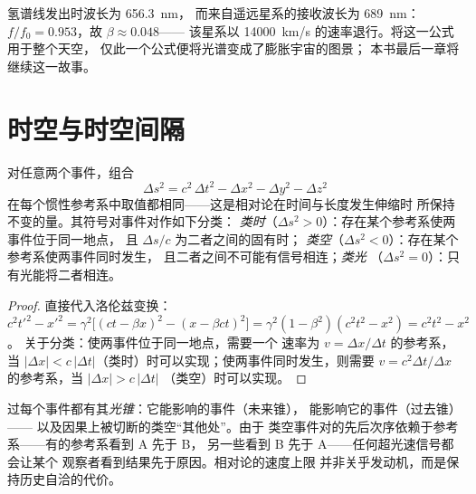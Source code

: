 \begin{example}[星系的退行]\label{ex:b3:relativistic-kinematics:redshift}
氢谱线发出时波长为 \qty{656.3}{nm}，
而来自遥远星系的接收波长为 \qty{689}{nm}：$f/f_0 = 0.953$，故 $\beta \approx 0.048$——
该星系以 \qty{14000}{km/s} 的速率退行。将这一公式用于整个天空，
仅此一个公式便将光谱变成了膨胀宇宙的图景；
本书最后一章将继续这一故事。
\end{example}

\section{时空与时空间隔}

\begin{theorem}[不变时空间隔]\label{thm:b3:relativistic-kinematics:interval}
对任意两个事件，组合
\[
\Delta s^2 = c^2\,\Delta t^2 - \Delta x^2 - \Delta y^2 - \Delta z^2
\]
在每个惯性参考系中取值都相同——这是相对论在时间与长度发生伸缩时
所保持不变的量。其符号对事件对作如下分类：
\emph{类时}（$\Delta s^2 > 0$）：存在某个参考系使两事件位于同一地点，
且 $\Delta s/c$ 为二者之间的固有时；
\emph{类空}（$\Delta s^2 < 0$）：存在某个参考系使两事件同时发生，
且二者之间不可能有信号相连；\emph{类光}
（$\Delta s^2 = 0$）：只有光能将二者相连。
\end{theorem}

\begin{proof}
直接代入洛伦兹变换：
$c^2t'^2 - x'^2 = \gamma^2\big[(ct - \beta x)^2 - (x - \beta ct)^2
\big] = \gamma^2(1 - \beta^2)(c^2t^2 - x^2) = c^2t^2 - x^2$。
关于分类：使两事件位于同一地点，需要一个
速率为 $v = \Delta x/\Delta t$ 的参考系，当 $|\Delta x| <
c\,|\Delta t|$（类时）时可以实现；使两事件同时发生，则需要 $v =
c^2\Delta t/\Delta x$ 的参考系，当 $|\Delta x| > c\,|\Delta t|$
（类空）时可以实现。
\end{proof}

\begin{remark}[因果性有其几何]\label{rem:b3:relativistic-kinematics:causality}
过每个事件都有其\emph{光锥}：它能影响的事件（未来锥），
能影响它的事件（过去锥）——
以及因果上被切断的类空“其他处”。由于
类空事件对的先后次序依赖于参考系——有的参考系看到 A 先于 B，
另一些看到 B 先于 A——任何超光速信号都会让某个
观察者看到结果先于原因。相对论的速度上限
并非关乎发动机，而是保持历史自洽的代价。
\end{remark}

